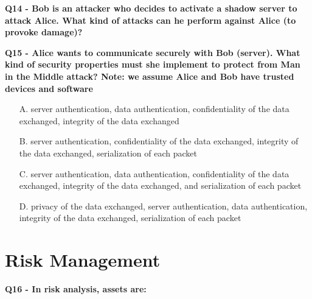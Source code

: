 \textbf{Q14 - Bob is an attacker who decides to activate a shadow server to attack Alice. What kind of attacks can he perform against Alice (to provoke damage)?}

\textbf{Q15 - Alice wants to communicate securely with Bob (server). What kind of security properties must she implement to protect from Man in the Middle attack? Note: we assume Alice and Bob have trusted devices and software}
\begin{enumerate}
    \item[A.] server authentication, data authentication, confidentiality of the data exchanged, integrity of the data exchanged
    \item[B.] server authentication, confidentiality of the data exchanged, integrity of the data exchanged, serialization of each packet
    \item[C.] server authentication, data authentication, confidentiality of the data exchanged, integrity of the data exchanged, and serialization of each packet
    \item[D.] privacy of the data exchanged, server authentication, data authentication, integrity of the data exchanged, serialization of each packet
\end{enumerate}


\section*{Risk Management}


\textbf{Q16 - In risk analysis, assets are:}

